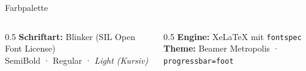 \documentclass[aspectratio=169,t,9pt]{beamer}
\begin{document}
\begin{frame}{Farbpalette}
\begin{center}
	\end{center}

	\vspace{0.5em}
	\begin{columns}[T]
		\begin{column}{0.5\textwidth}
			\textbf{Schriftart:} Blinker (SIL Open Font License)\\[3pt]
			{\BlinkHeadline SemiBold · }{\BlinkRegular Regular · }\textit{Light (Kursiv)}
		\end{column}
		\begin{column}{0.5\textwidth}
			\textbf{Engine:} XeLaTeX mit \texttt{fontspec}\\[3pt]
			\textbf{Theme:} Beamer Metropolis · \texttt{progressbar=foot}
		\end{column}
	\end{columns}
\end{frame}
\end{document}
